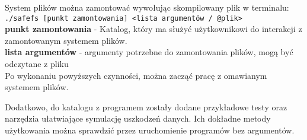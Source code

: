 System plików można zamontować wywołując skompilowany plik w terminalu:
\\
 \verb|./safefs [punkt zamontowania] <lista argumentów / @plik>|
\\
\textbf{punkt zamontowania} - Katalog, który ma służyć użytkownikowi do interakcji z zamontowanym systemem plików.
\\
\textbf{lista argumentów}  - argumenty potrzebne do zamontowania plików, mogą być odczytane z pliku \\
Po wykonaniu powyższych czynności, można zacząć pracę z omawianym systemem plików.

Dodatkowo, do katalogu z programem zostały dodane przykładowe testy oraz narzędzia ułatwiające symulację uszkodzeń danych. Ich dokładne metody użytkowania można sprawdzić przez uruchomienie programów bez argumentów.

